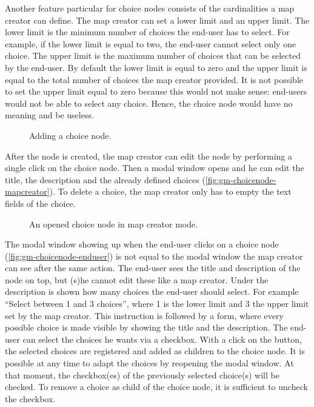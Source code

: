 Another feature particular for choice nodes consists of the cardinalities a map creator can define. The map creator can set a lower limit and an upper limit. The lower limit is the minimum number of choices the end-user has to select. For example, if the lower limit is equal to two, the end-user cannot select only one choice. The upper limit is the maximum number of choices that can be selected by the end-user. By default the lower limit is equal to zero and the upper limit is equal to the total number of choices the map creator provided. It is not possible to set the upper limit equal to zero because this would not make sense: end-users would not be able to select any choice. Hence, the choice node would have no meaning and be useless.

\begin{figure}[H]
	\centering
	\caption{Adding a choice node.}
	\label{fig:gm-add-choice}
\end{figure}

After the node is created, the map creator can edit the node by performing a single click on the choice node. Then a modal window opens and he can edit the title, the description and the already defined choices (\autoref{fig:gm-choicenode-mapcreator}). To delete a choice, the map creator only has to empty the text fields of the choice.

\begin{figure}[H]
	\centering
	\caption{An opened choice node in map creator mode.}
	\label{fig:gm-choicenode-mapcreator}
\end{figure}

The modal window showing up when the end-user clicks on a choice node (\autoref{fig:gm-choicenode-enduser}) is not equal to the modal window the map creator can see after the same action. The end-user sees the title and description of the node on top, but (s)he cannot edit these like a map creator. Under the description is shown how many choices the end-user should select. For example ``Select between 1 and 3 choices'', where 1 is the lower limit and 3 the upper limit set by the map creator. This instruction is followed by a form, where every possible choice is made visible by showing the title and the description. The end-user can select the choices he wants via a checkbox. With a click on the button, the selected choices are registered and added as children to the choice node. It is possible at any time to adapt the choices by reopening the modal window. At that moment, the checkbox(es) of the previously selected choice(s) will be checked. To remove a choice as child of the choice node, it is sufficient to uncheck the checkbox.\\

